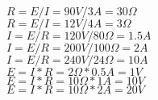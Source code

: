 \documentclass{article}
\begin{document}
\thispagestyle{empty}

$ R = E / I = 90 V / 3 A = 30 \Omega $ \\
$ R = E / I = 12 V / 4 A = 3 \Omega $ \\
$ I = E / R = 120 V / 80 \Omega = 1.5 A $ \\
$ I = E / R = 200 V / 100 \Omega = 2 A $ \\
$ I = E / R = 240 V / 24 \Omega = 10 A $ \\
$ E = I * R = 2 \Omega * 0.5 A = 1 V $ \\
$ E = I * R = 10 \Omega * 1 A = 10 V $ \\
$ E = I * R = 10 \Omega * 2 A = 20 V $ \\
\end{document}
